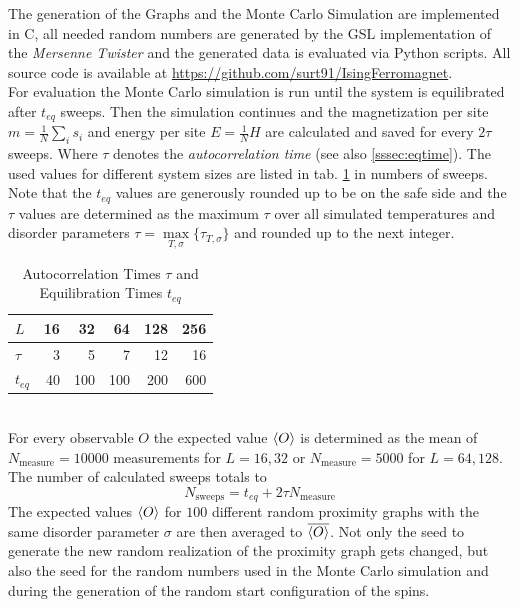 The generation of the Graphs and the Monte Carlo Simulation are implemented
in C, all needed random numbers are generated by the GSL \cite{GSL}
implementation of the \emph{Mersenne Twister} \cite{Matsumoto1998} and
the generated data is evaluated via Python scripts.
All source code is available at \url{https://github.com/surt91/IsingFerromagnet}.\\

For evaluation the Monte Carlo simulation is run until the system
is equilibrated after \(t_{eq}\) sweeps. Then the simulation continues
and the magnetization per site \(m=\frac{1}{N}\sum_i s_i\) and energy
per site \(E=\frac{1}{N} H\) are calculated and saved for every
\(2\tau\) sweeps. Where \(\tau\) denotes the \emph{autocorrelation time}
(see also \ref{sssec:eqtime}). The used values for different system sizes
are listed in tab. \ref{tab:tauAndTeq} in numbers of sweeps. Note that
the \(t_{eq}\) values are generously rounded up to be on the safe side
and the \(\tau\) values are determined as the maximum \(\tau\) over all
simulated temperatures and disorder parameters \(\tau = \underset{T,\sigma}{\max} \{\tau_{T,\sigma}\}\)
and rounded up to the next integer.
\begin{table}[htbp]
    \center
    \begin{tabular}{l r r r r r}
        \toprule
        \(L\)    & 16 &  32 &  64 & 128 & 256\\
        \midrule
        \(\tau\) &  3 &   5 &   7 &  12 &  16\\
        \(t_{eq}\) & 40 & 100 & 100 & 200 & 600\\
        \bottomrule
    \end{tabular}
    \caption{Autocorrelation Times $\tau$ and Equilibration Times $t_{eq}$}
    \label{tab:tauAndTeq}
\end{table}\\
For every observable \(O\) the expected value \(\left< O \right>\) is determined
as the mean of \(N_{\mathrm{measure}}=10000\) measurements for \(L=16,32\)
or \(N_{\mathrm{measure}}=5000\) for \(L=64,128\). The number of
calculated sweeps totals to
\[N_{\mathrm{sweeps}}=t_{eq}+2\tau N_{\mathrm{measure}}\]
The expected values \(\left< O \right>\) for \(100\) different random proximity
graphs with the same disorder parameter \(\sigma\) are then averaged to
\(\overline{\left< O \right>}\). Not only the seed to generate the new random
realization of the proximity graph gets changed, but also the seed for
the random numbers used in the Monte Carlo simulation and during the
generation of the random start configuration of the spins.\\
